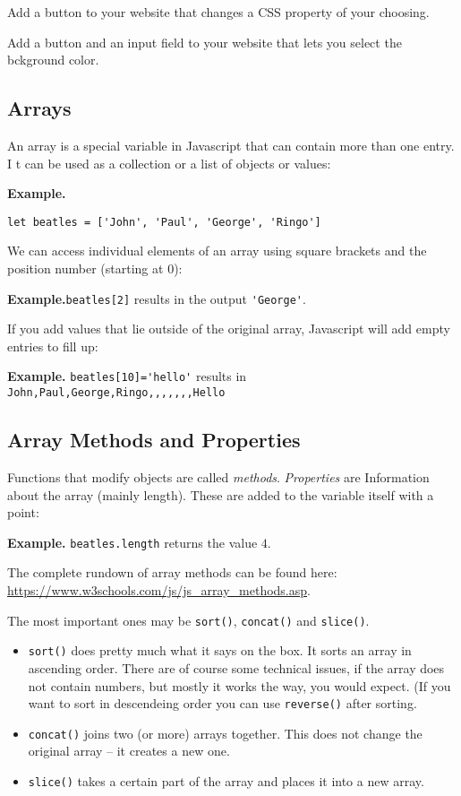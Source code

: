 \documentclass[11pt,a4paper]{report}
\begin{document}
\begin{ex}
Add a button to your website that changes a CSS property of your choosing.
\end{ex}

\begin{ex}
Add a button and an input field to your website that lets you select the bckground color.
\end{ex}


\newpage

\subsection{Arrays}

An array is a special variable in Javascript that can contain more than one entry. I t can be used as a collection or a list of objects or values:

{\bf Example.}
\begin{verbatim}
let beatles = ['John', 'Paul', 'George', 'Ringo']
\end{verbatim}

We can access individual elements of an array using square brackets and the position number (starting at $0$): 

{\bf Example.}\verb|beatles[2]| results in the output \verb|'George'|.

If you add values that lie outside of the original array,  Javascript will add empty entries to fill up:

{\bf Example.} \verb|beatles[10]='hello'| results in 
\verb|John,Paul,George,Ringo,,,,,,,Hello|

\subsection{Array Methods and Properties}

Functions that modify objects are called \emph{methods}.  \emph{Properties} are Information about the array (mainly length). These are added to the variable itself with a point:

{\bf Example.} \verb|beatles.length| returns the value $4$.

The complete rundown of array methods can be found here:
\url{https://www.w3schools.com/js/js_array_methods.asp}.

The most important ones may be \verb|sort()|, \verb|concat()| and \verb|slice()|. 

\begin{itemize}
\item \verb|sort()| does pretty much what it says on the box. It sorts an array in ascending order. There are of course some technical issues, if the array does not contain numbers, but mostly it works the way, you would expect. (If you want to sort in descendeing order you can use \verb|reverse()| after sorting.
\item \verb|concat()| joins two (or more) arrays together. This does not change the original array -- it creates a new one.
\item \verb|slice()| takes a certain part of the array and places it into a new array.
\end{itemize}
\end{document}
